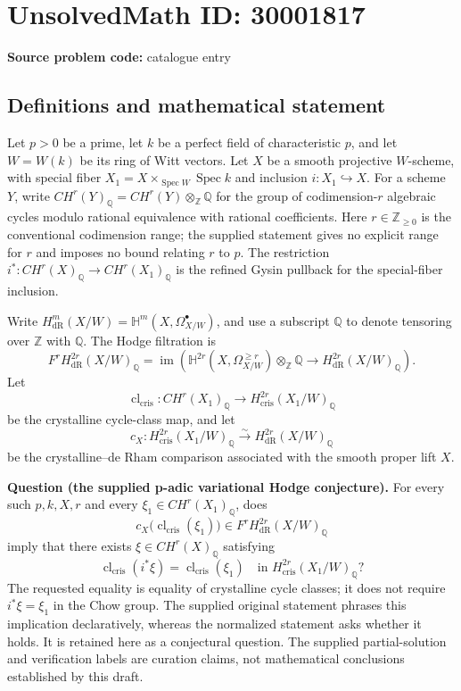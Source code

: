 \documentclass[11pt]{article}
\newcommand{\Z}{\mathbb{Z}}
\newcommand{\Q}{\mathbb{Q}}
\begin{document}
\section*{UnsolvedMath ID: 30001817}
\textbf{Source problem code:} catalogue entry
\subsection{Definitions and mathematical statement}
Let \(p>0\) be a prime, let \(k\) be a perfect field of characteristic \(p\), and let \(W=W(k)\) be its ring of Witt vectors. Let \(X\) be a smooth projective \(W\)-scheme, with special fiber \(X_1=X\times_{\operatorname{Spec}W}\operatorname{Spec}k\) and inclusion \(i:X_1\hookrightarrow X\). For a scheme \(Y\), write \(CH^r(Y)_{\Q}=CH^r(Y)\otimes_{\Z}\Q\) for the group of codimension-\(r\) algebraic cycles modulo rational equivalence with rational coefficients. Here \(r\in\Z_{\geq 0}\) is the conventional codimension range; the supplied statement gives no explicit range for \(r\) and imposes no bound relating \(r\) to \(p\). The restriction \(i^*:CH^r(X)_{\Q}\to CH^r(X_1)_{\Q}\) is the refined Gysin pullback for the special-fiber inclusion.

Write \(H^m_{\mathrm{dR}}(X/W)=\mathbb H^m(X,\Omega^\bullet_{X/W})\), and use a subscript \(\Q\) to denote tensoring over \(\Z\) with \(\Q\). The Hodge filtration is
\[
F^rH^{2r}_{\mathrm{dR}}(X/W)_{\Q}
=\operatorname{im}\!\left(
\mathbb H^{2r}(X,\Omega^{\geq r}_{X/W})\otimes_{\Z}\Q
\longrightarrow H^{2r}_{\mathrm{dR}}(X/W)_{\Q}
\right).
\]
Let
\[
\operatorname{cl}_{\mathrm{cris}}:CH^r(X_1)_{\Q}\longrightarrow H^{2r}_{\mathrm{cris}}(X_1/W)_{\Q}
\]
be the crystalline cycle-class map, and let
\[
c_X:H^{2r}_{\mathrm{cris}}(X_1/W)_{\Q}\xrightarrow{\sim}H^{2r}_{\mathrm{dR}}(X/W)_{\Q}
\]
be the crystalline--de Rham comparison associated with the smooth proper lift \(X\).

\textbf{Question (the supplied p-adic variational Hodge conjecture).} For every such \(p,k,X,r\) and every \(\xi_1\in CH^r(X_1)_{\Q}\), does
\[
c_X\bigl(\operatorname{cl}_{\mathrm{cris}}(\xi_1)\bigr)
\in F^rH^{2r}_{\mathrm{dR}}(X/W)_{\Q}
\]
imply that there exists \(\xi\in CH^r(X)_{\Q}\) satisfying
\[
\operatorname{cl}_{\mathrm{cris}}(i^*\xi)
=\operatorname{cl}_{\mathrm{cris}}(\xi_1)
\quad\text{in }H^{2r}_{\mathrm{cris}}(X_1/W)_{\Q}?
\]
The requested equality is equality of crystalline cycle classes; it does not require \(i^*\xi=\xi_1\) in the Chow group. The supplied original statement phrases this implication declaratively, whereas the normalized statement asks whether it holds. It is retained here as a conjectural question. The supplied partial-solution and verification labels are curation claims, not mathematical conclusions established by this draft.
\end{document}
